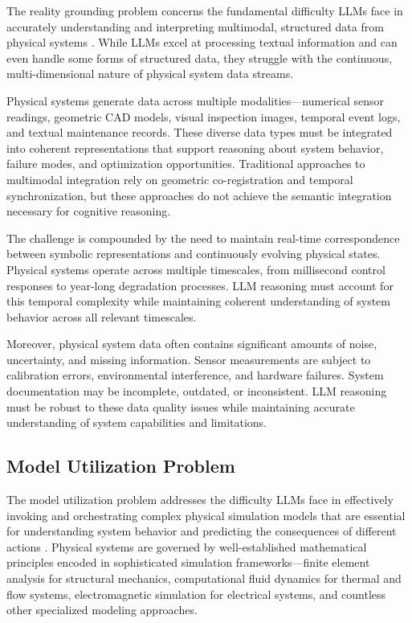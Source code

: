 The reality grounding problem concerns the fundamental difficulty LLMs face in accurately understanding and interpreting multimodal, structured data from physical systems \cite{harnad1990symbol, barsalou2008grounded}. While LLMs excel at processing textual information and can even handle some forms of structured data, they struggle with the continuous, multi-dimensional nature of physical system data streams.

Physical systems generate data across multiple modalities—numerical sensor readings, geometric CAD models, visual inspection images, temporal event logs, and textual maintenance records. These diverse data types must be integrated into coherent representations that support reasoning about system behavior, failure modes, and optimization opportunities. Traditional approaches to multimodal integration rely on geometric co-registration and temporal synchronization, but these approaches do not achieve the semantic integration necessary for cognitive reasoning.

The challenge is compounded by the need to maintain real-time correspondence between symbolic representations and continuously evolving physical states. Physical systems operate across multiple timescales, from millisecond control responses to year-long degradation processes. LLM reasoning must account for this temporal complexity while maintaining coherent understanding of system behavior across all relevant timescales.

Moreover, physical system data often contains significant amounts of noise, uncertainty, and missing information. Sensor measurements are subject to calibration errors, environmental interference, and hardware failures. System documentation may be incomplete, outdated, or inconsistent. LLM reasoning must be robust to these data quality issues while maintaining accurate understanding of system capabilities and limitations.

\subsection{Model Utilization Problem}

The model utilization problem addresses the difficulty LLMs face in effectively invoking and orchestrating complex physical simulation models that are essential for understanding system behavior and predicting the consequences of different actions \cite{negri2017review, tao2019digital}. Physical systems are governed by well-established mathematical principles encoded in sophisticated simulation frameworks—finite element analysis for structural mechanics, computational fluid dynamics for thermal and flow systems, electromagnetic simulation for electrical systems, and countless other specialized modeling approaches.

